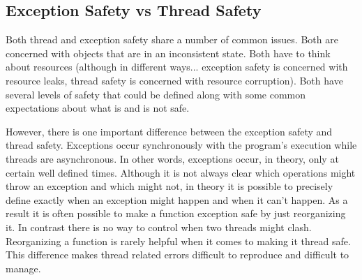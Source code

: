 \subsection{Exception Safety vs Thread Safety}
\label{exception-safety}

Both thread and exception safety share a number of common issues. Both are concerned with
objects that are in an inconsistent state. Both have to think about resources (although in
different ways... exception safety is concerned with resource leaks, thread safety is concerned
with resource corruption). Both have several levels of safety that could be defined along with
some common expectations about what is and is not safe.

However, there is one important difference between the exception safety and thread safety.
Exceptions occur synchronously with the program's execution while threads are asynchronous. In
other words, exceptions occur, in theory, only at certain well defined times. Although it is not
always clear which operations might throw an exception and which might not, in theory it is
possible to precisely define exactly when an exception might happen and when it can't happen. As
a result it is often possible to make a function exception safe by just reorganizing it. In
contrast there is no way to control when two threads might clash. Reorganizing a function is
rarely helpful when it comes to making it thread safe. This difference makes thread related
errors difficult to reproduce and difficult to manage.
